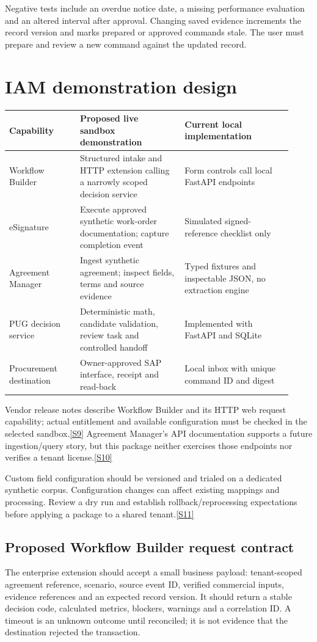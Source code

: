 \documentclass[11pt,letterpaper]{article}
\newcommand{\src}[1]{\hyperref[src:#1]{[#1]}}
\begin{document}
Negative tests include an overdue notice date, a missing performance evaluation and an altered interval after approval. Changing saved evidence increments the record version and marks prepared or approved commands stale. The user must prepare and review a new command against the updated record.

\section{IAM demonstration design}
\begin{longtable}{p{0.23\linewidth}p{0.34\linewidth}p{0.35\linewidth}}
\toprule Capability & Proposed live sandbox demonstration & Current local implementation\\\midrule
Workflow Builder & Structured intake and HTTP extension calling a narrowly scoped decision service & Form controls call local FastAPI endpoints\\
eSignature & Execute approved synthetic work-order documentation; capture completion event & Simulated signed-reference checklist only\\
Agreement Manager & Ingest synthetic agreement; inspect fields, terms and source evidence & Typed fixtures and inspectable JSON, no extraction engine\\
PUG decision service & Deterministic math, candidate validation, review task and controlled handoff & Implemented with FastAPI and SQLite\\
Procurement destination & Owner-approved SAP interface, receipt and read-back & Local inbox with unique command ID and digest\\
\bottomrule
\end{longtable}

Vendor release notes describe Workflow Builder and its HTTP web request capability; actual entitlement and available configuration must be checked in the selected sandbox.\src{S9} Agreement Manager's API documentation supports a future ingestion/query story, but this package neither exercises those endpoints nor verifies a tenant license.\src{S10}

Custom field configuration should be versioned and trialed on a dedicated synthetic corpus. Configuration changes can affect existing mappings and processing. Review a dry run and establish rollback/reprocessing expectations before applying a package to a shared tenant.\src{S11}

\subsection{Proposed Workflow Builder request contract}
The enterprise extension should accept a small business payload: tenant-scoped agreement reference, scenario, source event ID, verified commercial inputs, evidence references and an expected record version. It should return a stable decision code, calculated metrics, blockers, warnings and a correlation ID. A timeout is an unknown outcome until reconciled; it is not evidence that the destination rejected the transaction.
\end{document}
